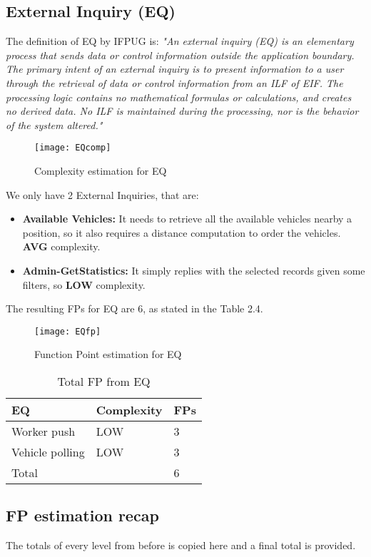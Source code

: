 \subsection{External Inquiry (EQ)}
The definition of EQ by IFPUG is: \bigbreak
\textit{"An external inquiry (EQ) is an elementary process that sends data or control information outside the application boundary. The primary intent of an external inquiry is to present information to a user through the retrieval of data or control information from an ILF of EIF. The processing logic contains no mathematical formulas or calculations, and creates no derived data. No ILF is maintained during the processing, nor is the behavior of the system altered."}
\bigbreak
\begin{figure}
  \centering
  \texttt{[image: EQcomp]}
  \caption{Complexity estimation for EQ}
\end{figure}
We only have 2 External Inquiries, that are:
\begin{itemize}
\item \textbf{Available Vehicles:} It needs to retrieve all the available vehicles nearby a position, so it also requires a distance computation to order the vehicles. \textbf{AVG} complexity.
\item \textbf{Admin-GetStatistics:} It simply replies with the selected records given some filters, so \textbf{LOW} complexity. 
\end{itemize}

The resulting FPs for EQ are 6, as stated in the Table 2.4.

\begin{figure}
  \centering
  \texttt{[image: EQfp]}
  \caption{Function Point estimation for EQ}
\end{figure}

\begin{table}
  \centering
    \begin{tabular}{| l | l | l |}
    \hline
    \textbf{EQ} & \textbf{Complexity} & \textbf{FPs} \\ \hline
    Worker push & LOW & 3 \\ \hline
    Vehicle polling & LOW & 3\\ \hline
    \hline
    \multicolumn{2}{|l|}{Total} & 6 \\ \hline
    \end{tabular}
  \caption{Total FP from EQ}
\end{table}

\subsection{FP estimation recap}
The totals of every level from before is copied here and a final total is provided. 

